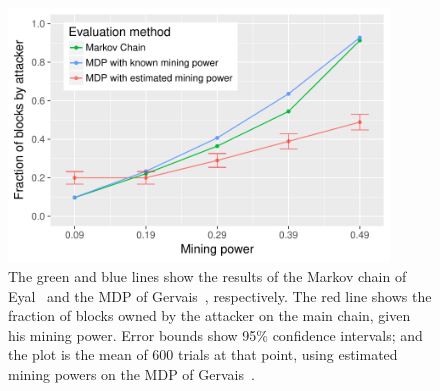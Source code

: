 \begin{figure}\begin{center}
	\includegraphics[width=0.9\textwidth]{graphs/problem}
	\caption{The green and blue lines show the results of the Markov chain of Eyal~\cite{eyal:2014} and the MDP of Gervais~\cite{Gervais:2016}, respectively. The red line shows the fraction of blocks owned by the attacker on the main chain, given his mining power.  Error bounds show 95\% confidence intervals; and the plot is the mean of 600 trials at that point, using estimated mining powers on the MDP of Gervais~\cite{Gervais:2016}. 
	\label{fig:RL}}
\end{center}\end{figure}

